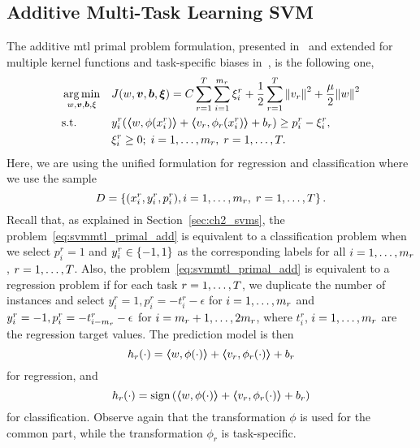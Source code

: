 \subsection{Additive Multi-Task Learning SVM}
The {additive} \acrshort{mtl} primal problem formulation, presented in~\cite{EvgeniouP04} 
and extended for multiple kernel functions and task-specific biases in~\cite{CaiC12}, is the following one,
\begin{equation}\label{eq:svmmtl_primal_add}
    \begin{aligned}
    & \argmin_{w, \fv{v}, \fv{b}, \xi}
    & & {J({w}, \fv{v}, \fv{b}, \fv{\xi}) = C \sum_{r= 1}^T \sum_{i=1}^{m_r} {\xi_{i}^r} + \frac{1}{2} \sum_{r= 1}^T{\norm{{v}_r}^2} + \frac{\mu}{2} {\norm{{w}}}^2} \\
    & \text{s.t.}
    & & y_{i}^r (\dotp{w}{\phi(x_{i}^r)} + \dotp{v_r}{\phi_r(x_{i}^r)} + b_r) \geq p_{i}^r - \xi_{i}^r ,  \\
    & & & \xi_{i}^r \geq 0; \;  i=1 , \dotsc , m_r, \;  r= 1,\dotsc, T  . \\
    \end{aligned}
\end{equation}
Here, we are using the unified formulation for regression and classification where we use the sample 
$$D = \left\{(x_i^r, y_i^r, p_i^r), i=1, \ldots, {m}_r, \; r=1, \ldots, T\right\}. $$
Recall
that, as explained in Section~\ref{sec:ch2_svms}, the problem~\eqref{eq:svmmtl_primal_add} is equivalent to a classification problem when we select $p_i^r=1$ and $y_i^r \in \left\{-1, 1\right\}$ as the corresponding labels for all $i=1, \ldots, m_r$, $r=1, \ldots, T$.
Also, the problem~\eqref{eq:svmmtl_primal_add} is equivalent to a regression problem if for each task $r=1, \ldots, T$, we duplicate the number of instances  and select $y_i^r=1, p_i^r=-t_{i}^r - \epsilon$ for $i=1, \ldots, m_r$ and $y_i^r=-1, p_i^r=-t_{i - m_r}^r - \epsilon$ for $i=m_r + 1, \ldots, 2m_r$, where $t_{i}^r$, $i=1, \ldots, m_r$ are the regression target values.
The prediction model is then 
\begin{equation}
    \nonumber
    h_r(\cdot) = \bm{\left\langle} w, \phi(\cdot) \bm{\right\rangle} + \bm{\left\langle} {v}_r, \phi_r(\cdot) \bm{\right\rangle} + b_r
\end{equation}
for regression, and 
\begin{equation}
    \nonumber
    h_r(\cdot) = \operatorname{sign}{ \left(\bm{\left\langle} w, \phi(\cdot) \bm{\right\rangle} + \bm{\left\langle} {v}_r, \phi_r(\cdot) \bm{\right\rangle} + b_r \right)}
\end{equation}
for classification.
Observe again that the transformation $\phi$ is used for the common part, while the transformation $\phi_r$ is task-specific.


